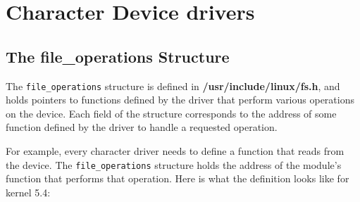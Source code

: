 \documentclass[10pt, oneside]{book}
\begin{document}
\section{Character Device drivers}
\label{sec:chardev}
\subsection{The file\_operations Structure}
\label{sec:file_operations}
The \verb|file_operations| structure is defined in \textbf{/usr/include/linux/fs.h}, and holds pointers to functions defined by the driver that perform various operations on the device.
Each field of the structure corresponds to the address of some function defined by the driver to handle a requested operation.

For example, every character driver needs to define a function that reads from the device.
The \verb|file_operations| structure holds the address of the module's function that performs that operation.
Here is what the definition looks like for kernel 5.4:
\end{document}
